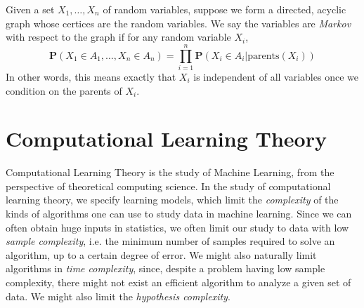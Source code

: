 Given a set $X_1, \dots, X_n$ of random variables, suppose we form a directed, acyclic graph whose certices are the random variables. We say the variables are \emph{Markov} with respect to the graph if for any random variable $X_i$,
%
\[ \mathbf{P}(X_1 \in A_1, \dots, X_n \in A_n) = \prod_{i = 1}^n \mathbf{P}(X_i \in A_i | \text{parents}(X_i)) \]
%
In other words, this means exactly that $X_i$ is independent of all variables once we condition on the parents of $X_i$.















\part{Computational Learning Theory}

Computational Learning Theory is the study of Machine Learning, from the perspective of theoretical computing science. In the study of computational learning theory, we specify learning models, which limit the \emph{complexity} of the kinds of algorithms one can use to study data in machine learning. Since we can often obtain huge inputs in statistics, we often limit our study to data with low \emph{sample complexity}, i.e. the minimum number of samples required to solve an algorithm, up to a certain degree of error. We might also naturally limit algorithms in \emph{time complexity}, since, despite a problem having low sample complexity, there might not exist an efficient algorithm to analyze a given set of data. We might also limit the \emph{hypothesis complexity}.

